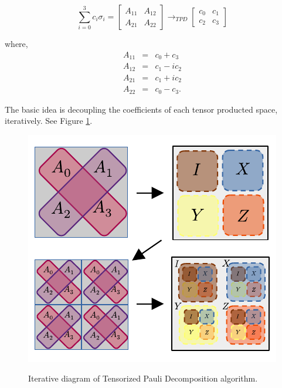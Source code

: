 \documentclass[twocolumn]{article}
\begin{document}
\begin{equation}
    \sum_{i=0}^3 c_i \sigma_i = 
    \begin{bmatrix}
        A_{11} & A_{12}\\
        A_{21} & A_{22}
    \end{bmatrix}
    \rightarrow_{TPD}
    \begin{bmatrix}
        c_0 & c_1\\
        c_2 & c_3
    \end{bmatrix}
\end{equation}

where, 
\begin{equation}
    \label{eq:tpd_transform}
    \begin{array}{ccc}
        A_{11} & = &  c_0 + c_3\\
        A_{12} & = &  c_1 - i c_2\\
        A_{21} & = &  c_1 + i c_2\\
        A_{22} & = &  c_0 - c_3.
    \end{array}
\end{equation}

The basic idea is decoupling the coefficients of each tensor producted space, iteratively. 
See Figure \ref{fig:tpd_diagram}.

\begin{figure}[!h]
    \centering
    \includegraphics*{images/tpd_diagram.pdf}
    \label{fig:tpd_diagram}
    \caption{Iterative diagram of Tensorized Pauli Decomposition algorithm.}
\end{figure}
\end{document}
